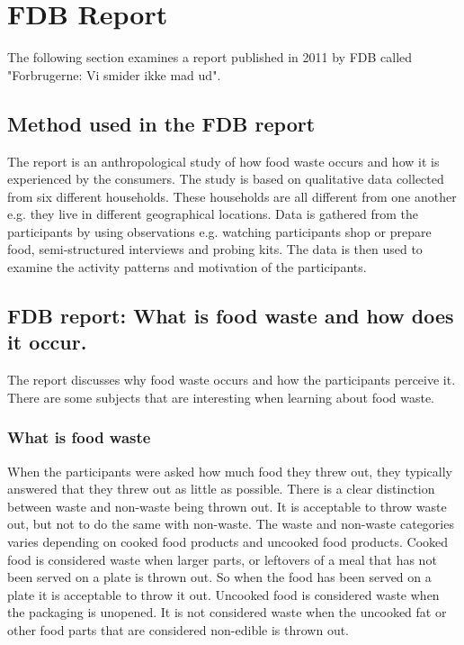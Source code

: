 \section{FDB Report}
The following section examines a report published in 2011 by FDB called "Forbrugerne: Vi smider ikke mad ud"\cite{madSpild_FDB}.
\subsection{Method used in the FDB report}
The report is an anthropological study of how food waste occurs and how it is experienced by the consumers. The study is based on qualitative data collected from six different households. These households are all different from one another e.g. they live in different geographical locations. Data is gathered from the participants by using observations e.g. watching participants shop or prepare food, semi-structured interviews and probing kits. The data is then used to examine the activity patterns and motivation of the participants.

\subsection{FDB report: What is food waste and how does it occur.}
The report discusses why food waste occurs and how the participants perceive it. There are some subjects that are interesting when learning about food waste. 

\subsubsection{What is food waste}
When the participants were asked how much food they threw out, they typically answered that they threw out as little as possible. There is a clear distinction between waste and non-waste being thrown out. It is acceptable to throw waste out, but not to do the same with non-waste. The waste and non-waste categories varies depending on cooked food products and uncooked food products. Cooked food is considered waste when larger parts, or leftovers of a meal that has not been served on a plate is thrown out. So when the food has been served on a plate it is acceptable to throw it out. Uncooked food is considered waste when the packaging is unopened. It is not considered waste when the uncooked fat or other food parts that are considered non-edible is thrown out.

